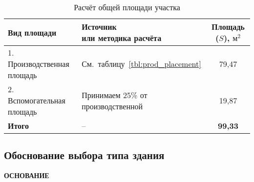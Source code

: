 \begin{table} [h!]
  \caption{
    Расчёт общей площади участка
  }\label{tbl:common_placement}
    \begin{tabular}{| m{5.8cm} | m{5.75cm} | c |}
      \hline
      \parbox{5.8cm}{
        \smallskip
        \centering Вид  площади
        \smallskip
      }
      & \parbox{5.75cm}{
          \smallskip
          \centering Источник \\ или методика расчёта
          \smallskip
      }
      & Площадь (\( S \)), \( \text{м}^2 \) \\
      \hline

      1. Производственная \newline площадь
      & \centering См.~таблицу~\ref{tbl:prod_placement}
      & 79,47 \\
      \hline

      2. Вспомогательная \newline площадь
      & \centering Принимаем 25\% \newline от производственной
      & 19,87 \\
      \hline


      \textbf{Итого} & \centering -- & \textbf{99,33} \\
      \hline
    \end{tabular}
\end{table}

\subsection{Обоснование выбора типа здания}

\textbf{ОСНОВАНИЕ}


